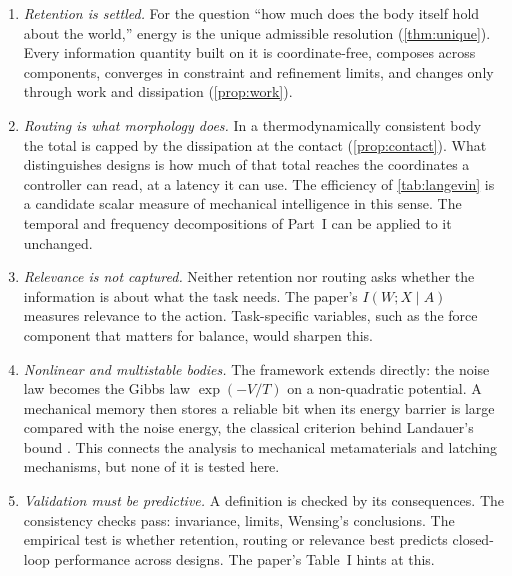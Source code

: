 \documentclass[11pt]{article}
\theoremstyle{definition}
\theoremstyle{remark}
\begin{document}
\begin{enumerate}
  \item \emph{Retention is settled.} For the question ``how much does the body itself hold
        about the world,'' energy is the unique admissible resolution
        (\cref{thm:unique}). Every information quantity built on it is coordinate-free,
        composes across components, converges in constraint and refinement limits, and
        changes only through work and dissipation (\cref{prop:work}).
  \item \emph{Routing is what morphology does.} In a thermodynamically consistent body the
        total is capped by the dissipation at the contact (\cref{prop:contact}). What
        distinguishes designs is how much of that total reaches the coordinates a
        controller can read, at a latency it can use. The efficiency of
        \cref{tab:langevin} is a candidate scalar measure of mechanical intelligence in
        this sense. The temporal and frequency decompositions of Part~I can be applied to
        it unchanged.
  \item \emph{Relevance is not captured.} Neither retention nor routing asks whether the
        information is about what the task needs. The paper's $I(W;X\mid A)$ measures
        relevance to the action. Task-specific variables, such as the force component that
        matters for balance, would sharpen this.
  \item \emph{Nonlinear and multistable bodies.} The framework extends directly: the noise
        law becomes the Gibbs law $\exp(-V/T)$ on a non-quadratic potential. A mechanical
        memory then stores a reliable bit when its energy barrier is large compared with
        the noise energy, the classical criterion behind Landauer's bound
        \citep{landauer1961irreversibility}. This connects the analysis to mechanical
        metamaterials and latching mechanisms, but none of it is tested here.
  \item \emph{Validation must be predictive.} A definition is checked by its consequences.
        The consistency checks pass: invariance, limits, Wensing's conclusions. The
        empirical test is whether retention, routing or relevance best predicts
        closed-loop performance across designs. The paper's Table~I hints at this.
\end{enumerate}

\end{document}

